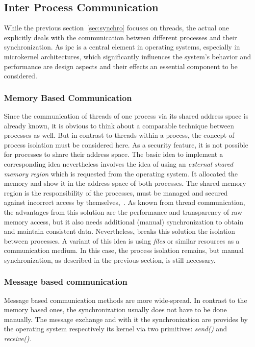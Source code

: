 \subsection{Inter Process Communication}\label{sec:ipc}
While the previous section~\ref{sec:synchro} focuses on threads, the actual one explicitly deals with the communication between different processes and their synchronization.
As \ac{ipc} is a central element in operating systems, especially in microkernel architectures, which significantly influences the system's behavior and performance are design aspects and their effects an essential component to be considered.

\subsubsection{Memory Based Communication}
Since the communication of threads of one process via its shared address space is already known, it is obvious to think about a comparable technique between processes as well.
But in contrast to threads within a process, the concept of process isolation must be considered here.
As a security feature, it is not possible for processes to share their address space. 
The basic idea to implement a corresponding idea nevertheless involves the idea of using an \textit{external shared memory region} which is requested from the operating system.
It allocated the memory and show it in the address space of both processes\cite{brause2017betriebssysteme}.
The shared memory region is the responsibility of the processes, must be managed and secured against incorrect access by themselves\cite{brause2017betriebssysteme},~\cite{glatz2015betriebssysteme}.
As known from thread communication, the advantages from this solution are the performance and transparency of raw memory access, but it also needs additional (manual) synchronization to obtain and maintain consistent data\cite{glatz2015betriebssysteme}.
Nevertheless, breaks this solution the isolation between processes. 
A variant of this idea is using \textit{files} or similar resources as a communication medium.
In this case, the process isolation remains, but manual synchronization, as described in the previous section, is still necessary\cite{brause2017betriebssysteme}.


\subsubsection{Message based communication}
Message based communication methods are more wide-spread.
In contrast to the memory based ones, the synchronization usually does not have to be done manually.
The message exchange and with it the synchronization are provides by the operating system respectively its kernel via two primitives: \textit{send()} and \textit{receive()}\cite{tanenbaum-modern-operating-systems}.

